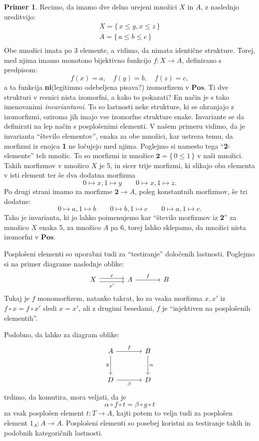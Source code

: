 \documentclass[12pt,a4paper]{book}
\theoremstyle{definition}
\theoremstyle{plain}
\theoremstyle{definition}
\newtheorem{primer}{Primer}[section]
\theoremstyle{remark}
\newcommand{\cat}[1]{\textbf{#1}}
\renewcommand{\set}[1]{\{\,#1\,\}}
\begin{document}
\begin{primer}
Recimo, da imamo dve delno urejeni množici $X$ in $A$, z naslednjo ureditvijo:
\begin{align*}
X = \set{x \leq y, x \leq z} \\
A = \set{a \leq b \leq c} \\
\end{align*}
Obe množici imata po 3 elemente, a vidimo, da nimata identične strukture. Torej, med njima imamo monotono bijektivno funkcijo $f : X \to A$, definirano s predpisom:
$$f(x) = a, \quad f(y) = b, \quad f(z) = c,$$
a ta funkcija \textbf{ni}(legitimno odebeljena pisava?) izomorfizem v $\cat{Pos}$. Ti dve strukturi v resnici nista izomorfni, a kako to pokazati? En način je s tako imenovanimi \emph{invariantami}. To so lastnosti neke strukture, ki se ohranjajo z izomorfizmi, oziroma jih imajo vse izomorfne strukture enake. Invariante se da definirati na lep način s posplošenimi elementi. V našem primeru vidimo, da je invarianta "`število elementov"', enaka za obe množici, kar ustreza temu, da morfizmi iz enojca \textbf{1} ne ločujejo med njima. Poglejmo si namesto tega "`\textbf{2}-elemente"' teh množic. To so morfizmi iz množice $\textbf{2} = \set{0 \leq 1}$ v naši množici. Takih morfizmov v množico $X$ je 5, in sicer trije morfizmi, ki slikajo oba elementa v isti element ter še dva dodatna morfizma
$$0 \mapsto x, 1 \mapsto y \qquad 0 \mapsto x, 1 \mapsto z.$$
Po drugi strani imamo za morfizme $\textbf{2} \to A$, poleg konstantnih morfizmov, še tri dodatne:
$$0 \mapsto a, 1 \mapsto b \qquad 0 \mapsto b, 1 \mapsto c \qquad 0 \mapsto a, 1 \mapsto c.$$
Tako je invarianta, ki jo lahko poimenujemo kar "`število morfizmov iz \textbf{2}"' za množico $X$ enaka 5, za množico $A$ pa 6, torej lahko sklepamo, da množici nista izomorfni v $\cat{Pos}$.
\end{primer}
%
Posplošeni elementi so uporabni tudi za "`testiranje"' določenih lastnosti. Poglejmo si na primer diagrame naslednje oblike:
%
$$\begin{tikzcd}[column sep=large]
X \ar[r, shift left, "x"] \ar[r, shift right, "x'"'] & A \ar[r, "f"] & B
\end{tikzcd}$$
Tukaj je $f$ monomorfizem, natanko takrat, ko za vsaka morfizma $x, x'$ iz $f \circ x = f \circ x'$ sledi $x = x'$, ali z drugimi besedami, $f$ je "`injektiven na posplošenih elementih"'.
%

Podobno, da lahko za diagram oblike:
$$\begin{tikzcd}[column sep=large, row sep=large]
A \ar[d, "g"'] \ar[r, "f"] & B \ar[d, "\alpha"] \\
D \ar[r, "\beta"'] & D
\end{tikzcd}$$
trdimo, da komutira, mora veljati, da je 
$$\alpha \circ f \circ  t = \beta \circ g \circ t$$
za vsak posplošen element $t : T \to A$, kajti potem to velja tudi za posplošen element $1_A : A \to A$. Posplošeni elementi so posebej koristni za testiranje takih in podobnih kategoričnih lastnosti.
\end{document}

